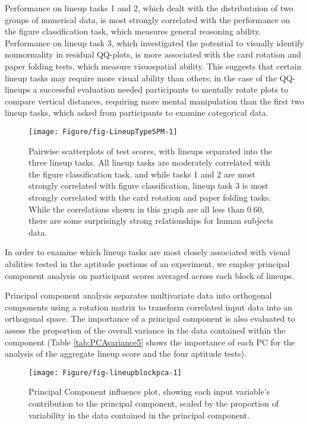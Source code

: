 \documentclass[journal]{vgtc}\usepackage[]{graphicx}\usepackage[]{color}
\begin{document}
Performance on lineup tasks 1 and 2, which dealt with the distributuion of two groups of numerical data, is most strongly correlated with the performance on the figure classification task, which measures general reasoning ability.
Performance on lineup task 3, which investigated the potential to visually identify nonnormality in residual QQ-plots, is more associated with the card rotation and paper folding tests, which measure visuospatial ability. This suggests that certain lineup tasks may require more visual ability than others; in the case of the QQ-lineups a successful evaluation  needed  participants to mentally rotate plots to compare vertical distances, requiring more mental manipulation than the first two lineup tasks, which asked from participants to examine categorical data.




\begin{figure}[ht]
\centering
\texttt{[image: Figure/fig-LineupTypeSPM-1]}
\caption{Pairwise scatterplots of test scores, with lineups separated into the three lineup tasks. All lineup tasks are moderately correlated with the figure classification task, and while tasks 1 and 2 are most strongly correlated with figure classification, lineup task 3 is most strongly correlated with the card rotation and paper folding tasks. \label{fig:lineuptaskmatrix} While the correlations shown in this graph are all less than 0.60, there are some surprisingly strong relationships for human subjects data.}
\end{figure}


In order to examine which lineup tasks are most closely associated with visual abilities tested in the aptitude portions of an experiment, we employ principal component analysis on participant scores averaged across each block of lineups.

Principal component analysis separates multivariate data into orthogonal components using a rotation matrix to transform correlated input data into an orthogonal space. The importance of a principal component is also evaluated to assess the proportion of the overall variance in the data contained within the component (Table \ref{tab:PCAvariance5} shows the importance of each PC for the analysis of the aggregate lineup score and the four aptitude tests). 


\begin{figure}[ht]
\texttt{[image: Figure/fig-lineupblockpca-1]}
\caption{Principal Component influence plot, showing each input variable's contribution to the principal component, scaled by the proportion of variability in the data contained in the principal component.\label{fig:influence}}
\end{figure}
\end{document}
